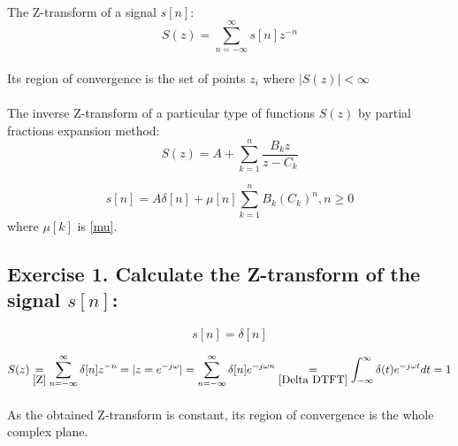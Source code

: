 \documentclass[14pt]{article}
\begin{document}
\paragraph{}
The Z-transform of a signal $ s[n] $:
\begin{equation} \label{Z}
	S(z)
	=
	\sum_{n = -\infty}^{\infty} s[n] z^{-n}
\end{equation}

\paragraph{}
Its region of convergence is the set of points $ z_i $ where 
	$ |S(z)| < \infty $

\paragraph{}
The inverse Z-transform of a particular type of functions $ S(z) $ 
	by partial fractions expansion method:
\begin{equation} \label{PFE-1}
	S(z)
	=
	A + \sum_{k = 1}^{n} \frac{B_k z}{z - C_k}
\end{equation}

\begin{equation} \label{PFE-2}
	s[n]
	=
	A \delta[n] + \mu[n] \sum_{k = 1}^{n} B_k (C_k)^n, n \geq 0
\end{equation}
where $ \mu[k] $ is \eqref{mu}.

\subsection{Exercise 1. Calculate the Z-transform of the signal 
	$ s[n] $:}
\begin{equation}
	s[n]
	=
	\delta[n]
\end{equation}

\begin{equation}
	S(z) 
	\underset{\eqref{Z}}{=}
	\sum_{n = -\infty}^{\infty} \delta[n] z^{-n}
	=
	|z = e^{-j \omega}|
	=
	\sum_{n = -\infty}^{\infty} \delta[n] e^{-j \omega n} 
	\underset{\eqref{Delta DTFT}}{=}
	\int_{-\infty}^\infty \delta(t) e^{-j \omega t} {d}t 
	=
	1
\end{equation}

\paragraph{}
As the obtained Z-transform is constant, its region of convergence 
	is the whole complex plane. 
\end{document}
